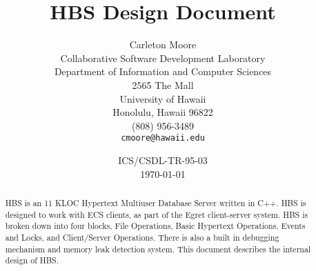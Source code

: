 
\title{HBS Design Document}

\author{Carleton Moore\\ 
        Collaborative Software Development Laboratory\\
        Department of Information and Computer Sciences\\ 
        2565 The Mall\\ 
        University of Hawaii\\ 
        Honolulu, Hawaii 96822\\ 
        (808) 956-3489\\
        {\tt cmoore@hawaii.edu}}

\date{ICS/CSDL-TR-95-03\\ \today}

\maketitle
\begin{abstract}

  HBS is an 11 KLOC Hypertext Multiuser Database Server written in
  C++. HBS is designed to work with ECS clients, as part of the Egret
  client-server system.  HBS is broken down into four blocks, File
  Operations, Basic Hypertext Operations, Events and Locks, and
  Client/Server Operations.  There is also a built in debugging mechanism
  and memory leak detection system.  This document describes the internal
  design of HBS.  

\end{abstract}

\newpage
\tableofcontents
\newpage